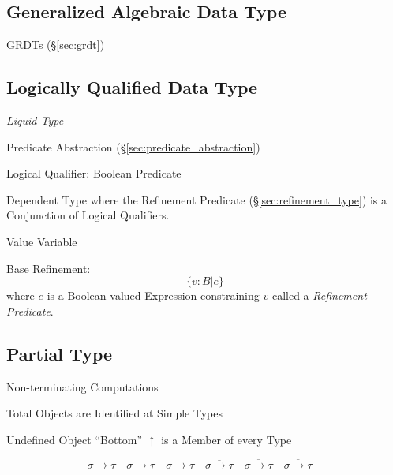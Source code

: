 \subsection{Generalized Algebraic Data Type}\label{sec:gadt}

\fist GRDTs (\S\ref{sec:grdt})



\subsection{Logically Qualified Data Type}
\label{sec:logically_qualified}

\cite{rondon-kawaguchi-jhala08}

\emph{Liquid Type}

Predicate Abstraction (\S\ref{sec:predicate_abstraction})

Logical Qualifier: Boolean Predicate

Dependent Type where the Refinement Predicate
(\S\ref{sec:refinement_type}) is a Conjunction of Logical Qualifiers.

Value Variable

Base Refinement:
\[
  \{ v : B | e \}
\]
where $e$ is a Boolean-valued Expression constraining $v$ called a
\emph{Refinement Predicate}.



\subsection{Partial Type}\label{sec:partial_type}

\cite{thompson99}

Non-terminating Computations

Total Objects are Identified at Simple Types

Undefined Object ``Bottom'' $\uparrow$ is a Member of every Type

\[
  \sigma \rightarrow \tau \quad
  \sigma \rightarrow \overline{\tau} \quad
  \overline{\sigma} \rightarrow \overline{\tau} \quad
  \overline{\sigma \rightarrow \tau} \quad
  \overline{\sigma \rightarrow \overline{\tau}} \quad
  \overline{\overline{\sigma} \rightarrow \overline{\tau}} \quad
\]



